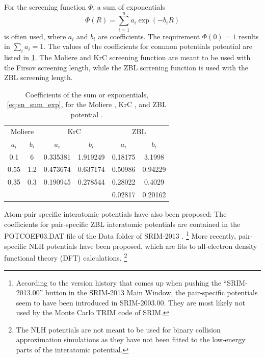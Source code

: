 For the screening function $\Phi$, a sum of exponentials
%
\begin{equation}
    \label{eq:sn_sum_exp}
    \Phi(R) = \sum_{i=1}^n a_i \exp(-b_i R)
\end{equation}
%
is often used, where \(a_i\) and \(b_i\) are coefficients.
The requirement \(\Phi(0) = 1\) results in \(\sum_i a_i = 1\).
The values of the coefficients for common potentials potential are listed in \cref{tab:sn_screen_coefs}.
The Moliere \cite{Bie80} and KrC \cite{Wil77} screening function are meant to be used with the Firsov screening length, while the ZBL scrrening function \cite{ZBL85} is used with the ZBL screening length.
%
\begin{table}
    \caption{Coefficients of the sum or exponentials, \cref{eq:sn_sum_exp}, for the Moliere \cite{Mol47}, KrC \cite{Wil77}, and ZBL potential \cite{ZBL85}.}
    \label{tab:sn_screen_coefs}
    \centering
    \begin{tabular}{|cc|cc|cc|}
        \hline
        \multicolumn{2}{|c|}{Moliere} & \multicolumn{2}{c|}{KrC} & \multicolumn{2}{c|}{ZBL} \\
        $a_i$ & $b_i$ & $a_i$    & $b_i$    & $a_i$   & $b_i$ \\
        \hline
        0.1   &  6    & 0.335381 & 1.919249 & 0.18175 & 3.1998 \\
        0.55  & 1.2   & 0.473674 & 0.637174 & 0.50986 & 0.94229 \\
        0.35  & 0.3   & 0.190945 & 0.278544 & 0.28022 & 0.4029 \\
              &       &          &          & 0.02817 & 0.20162 \\
        \hline
    \end{tabular}
\end{table}

Atom-pair specific interatomic potentials have also been proposed:
The coefficients for pair-specific ZBL interatomic potentials are contained in the POTCOEF03.DAT file of the Data folder of SRIM-2013 \cite{SRIM-2013}.%
%
\footnote{According to the version history that comes up when pushing the “SRIM-2013.00” button in the SRIM-2013 Main Window, the pair-specific potentials seem to have been introduced in SRIM-2003.00. They are most likely not used by the Monte Carlo TRIM code of SRIM.
}
%
More recently, pair-specific NLH potentials \cite{Nor25} have been proposed, which are fits to all-electron density functional theory (DFT) calculations.%
%
\footnote{The NLH potentials are not meant to be used for binary collision approximation simulations as they have not been fitted to the low-energy parts of the interatomic potential.
}
%

